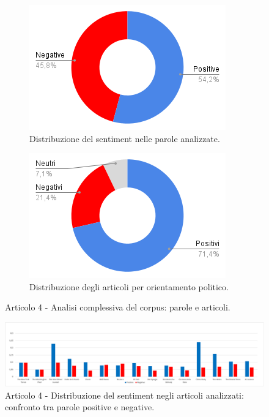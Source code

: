 \begin{figure}[H]
    \centering
    \begin{subfigure}[t]{0.48\textwidth}
        \centering
        \includegraphics[width=\linewidth]{Immagini//Articolo4/Articolo 4 - Rapporto Totale Parole.png}
        \caption{Distribuzione del sentiment nelle parole analizzate.}
        \label{fig:totale-parole-a4}
    \end{subfigure}
    \hfill
    \begin{subfigure}[t]{0.48\textwidth}
        \centering
        \includegraphics[width=\linewidth]{Immagini//Articolo4/Articolo 4 - Rapporto Totale Articoli.png}
        \caption{Distribuzione degli articoli per orientamento politico.}
        \label{fig:totale-articoli-a4}
    \end{subfigure}
    \caption{Articolo 4 - Analisi complessiva del corpus: parole e articoli.}
    \label{fig:analisi-totale-a4}

    \centering
    \includegraphics[width=1\linewidth]{Immagini//Articolo4/Articolo 4 - Analisi Grafica Risultati Totali.png}
    \caption{Articolo 4 - Distribuzione del sentiment negli articoli analizzati: confronto tra parole positive e negative.}
    \label{fig:risultati-totali-a4}
\end{figure}
